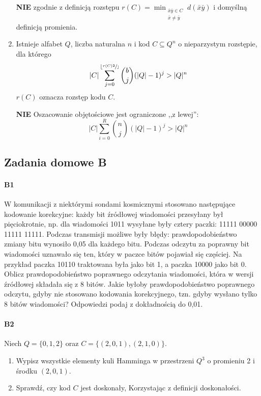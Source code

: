\documentclass[a4paper,12pt]{article}
\newcommand\floor[1]{\lfloor#1\rfloor} %
\theoremstyle{definition}%
\theoremstyle{definition}
\theoremstyle{problem}
\begin{document}
\begin{enumerate}[label=\alph*)]
\textbf{NIE} zgodnie z definicją rozstępu $r(C)=\min _{\begin{matrix}
\bar{x}\bar{y}\in C\\
\bar{x}\neq\bar{y}
\end{matrix}}d(\bar{x}\bar{y})$ i domyślną definicją promienia.
\item Istnieje alfabet $Q$, liczba naturalna $n$ i kod $C \subseteq Q^n$ o nieparzystym rozstępie, dla którego $$|C|\sum ^{\floor{\sfrac{r(C){2}}}} _{j=0} \binom{b}{j}(|Q| - 1)^j > |Q|^n$$ $r(C)$ oznacza rozstęp kodu $C$.

\textbf{NIE} Oszacowanie objętościowe jest ograniczone ,,z lewej'':
$$|C|\sum ^{R} _{i=0} \binom{n}{j}(|Q| - 1)^j > |Q|^n$$
\end{enumerate}

\subsection{Zadania domowe B}
\paragraph{B1} W komunikacji z niektórymi sondami kosmicznymi stosowano następujące kodowanie korekcyjne: każdy bit źródłowej wiadomości przesyłany był pięciokrotnie, np. dla wiadomości 1011 wysyłane były cztery paczki: 11111 00000 11111 11111. Podczas transmisji możliwe były błędy: prawdopodobieństwo zmiany bitu wynosiło 0,05 dla każdego bitu. Podczas odczytu za poprawny bit wiadomości uznawało się ten, który w paczce bitów pojawiał się częściej. Na przykład paczka 10110 traktowana była jako bit 1, a paczka 10000 jako bit 0. Oblicz prawdopodobieństwo poprawnego odczytania wiadomości, która w wersji źródłowej składała się z 8 bitów. Jakie byłoby prawdopodobieństwo poprawnego odczytu, gdyby nie stosowano kodowania korekcyjnego, tzn. gdyby wysłano tylko 8 bitów wiadomości? Odpowiedzi podaj z dokładnością do 0,01.

\paragraph{B2} Niech $Q = \{0, 1, 2\}$ oraz $C = \{(2, 0, 1),(2, 1, 0)\}$.
\begin{enumerate}[label=\alph*)]
\item Wypisz wszystkie elementy kuli Hamminga w przestrzeni $Q^3$ o promieniu 2 i środku $(2, 0, 1)$.
\item Sprawdź, czy kod $C$ jest doskonały, Korzystając z definicji doskonałości.
\end{enumerate}
\end{document}
